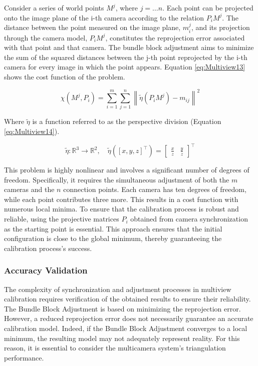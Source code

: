 Consider a series of world points $M^j$, where $j = \dots n$. Each point can be projected onto the image plane of the i-th camera according to the relation $P_i M^j$. The distance between the point measured on the image plane, $m_i^j$, and its projection through the camera model, $P_i M^j$, constitutes the reprojection error associated with that point and that camera.
The bundle block adjustment aims to minimize the sum of the squared distances between the j-th point reprojected by the i-th camera for every image in which the point appears.
Equation \ref{eq:Multiview13} shows the cost function of the problem.

\begin{equation}
  \chi(M^j, P_i) = \sum_{i=1}^{m} \sum_{j=1}^{n} \left\| \tilde{\eta}(P_i M^j) - m_{ij} \right\|^2
  \label{eq:Multiview13}
\end{equation}

Where $\tilde{\eta}$ is a function referred to as the perspective division (Equation \ref{eq:Multiview14}).

\begin{equation}
  \tilde{\eta}: \mathbb{R}^3 \to \mathbb{R}^2, \quad \tilde{\eta}([x, y, z]^\top) = 
  \begin{bmatrix} 
    \displaystyle\frac{x}{z} &
    \displaystyle\frac{y}{z} 
  \end{bmatrix}^\top
  \label{eq:Multiview14}
\end{equation}

This problem is highly nonlinear and involves a significant number of degrees of freedom. Specifically, it requires the simultaneous adjustment of both the $m$ cameras and the $n$ connection points. Each camera has ten degrees of freedom, while each point contributes three more. 
This results in a cost function with numerous local minima. 
To ensure that the calibration process is robust and reliable, using the projective matrices $P_i$ obtained from camera synchronization as the starting point is essential. This approach ensures that the initial configuration is close to the global minimum, thereby guaranteeing the calibration process's success.

\subsubsection{Accuracy Validation}

The complexity of synchronization and adjustment processes in multiview calibration requires verification of the obtained results to ensure their reliability.
The Bundle Block Adjustment is based on minimizing the reprojection error. 
However, a reduced reprojection error does not necessarily guarantee an accurate calibration model.
Indeed, if the Bundle Block Adjustment converges to a local minimum, the resulting model may not adequately represent reality. For this reason, it is essential to consider the multicamera system's triangulation performance.

